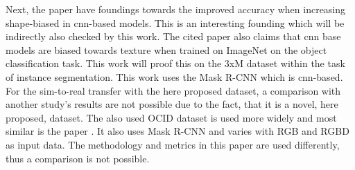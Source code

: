 		Next, the paper  \cite{Geirhos2022} have foundings towards the improved accuracy when increasing shape-biased in \ac{cnn}-based models. This is an interesting founding which will be indirectly also checked by this work. The cited paper also claims that \ac{cnn} base models are biased towards texture when trained on ImageNet on the object classification task. This work will proof this on the 3xM dataset within the task of instance segmentation. This work uses the Mask R-CNN which is \ac{cnn}-based.
		\clearpage
		For the sim-to-real transfer with the here proposed dataset, a comparison with another study's results are not possible due to the fact, that it is a novel, here proposed, dataset. The also used OCID dataset \cite{Suchi2019} is used more widely and most similar is the paper  \cite{Xiang2021}. It also uses Mask R-CNN \cite{Kaiming2017} and varies with RGB and RGBD as input data. The methodology and metrics in this paper are used differently, thus a comparison is not possible. %
		
	
